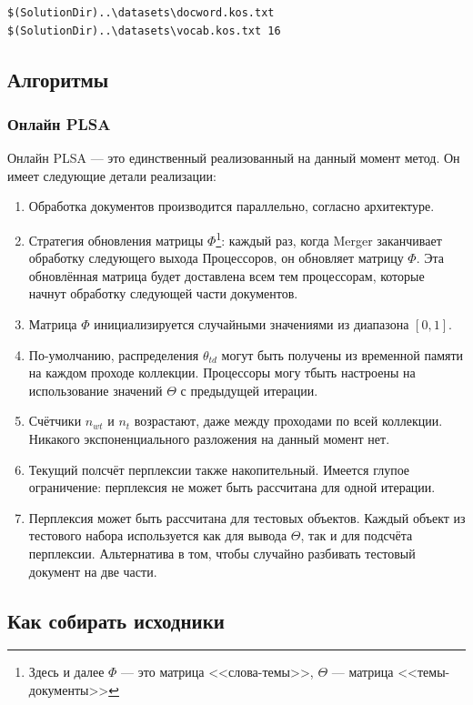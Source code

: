 \documentclass[12pt]{article}
\begin{document}
{\small
\begin{verbatim}
$(SolutionDir)..\datasets\docword.kos.txt $(SolutionDir)..\datasets\vocab.kos.txt 16
\end{verbatim}}

\subsection{Алгоритмы}
\subsubsection{Онлайн PLSA}
Онлайн PLSA --- это единственный реализованный на данный момент метод. Он имеет следующие детали реализации:

\begin{enumerate}
	\item Обработка документов производится параллельно, согласно архитектуре.
	\item Стратегия обновления матрицы $\Phi$\footnote{Здесь и далее $\Phi$ --- это матрица <<слова-темы>>, $\Theta$ --- матрица <<темы-документы>>}: каждый раз, когда Merger заканчивает обработку следующего выхода Процессоров, он обновляет матрицу $\Phi$. Эта обновлённая матрица будет доставлена всем тем процессорам, которые начнут обработку следующей части документов. 
	\item Матрица $\Phi$ инициализируется случайными значениями из диапазона $[0,1]$.
	
    \item По-умолчанию, распределения $\theta_{t d}$ могут быть получены из временной памяти на каждом проходе коллекции. Процессоры могу тбыть настроены на использование значений $\Theta$ с предыдущей итерации.
    \item Счётчики $n_{wt}$ и $n_t$ возрастают, даже между проходами по всей коллекции. Никакого экспоненциального разложения на данный момент нет.
    	
    
    \item Текущий полсчёт перплексии также накопительный. Имеется глупое ограничение: перплексия не может быть рассчитана для одной итерации.
    \item Перплексия может быть рассчитана для тестовых объектов. Каждый объект из тестового набора используется как для вывода $\Theta$, так и для подсчёта перплексии.
    Альтернатива в том, чтобы случайно разбивать тестовый документ на две части.
\end{enumerate}

\subsection{Как собирать исходники}
\label{label:how_to_build}
\end{document}
